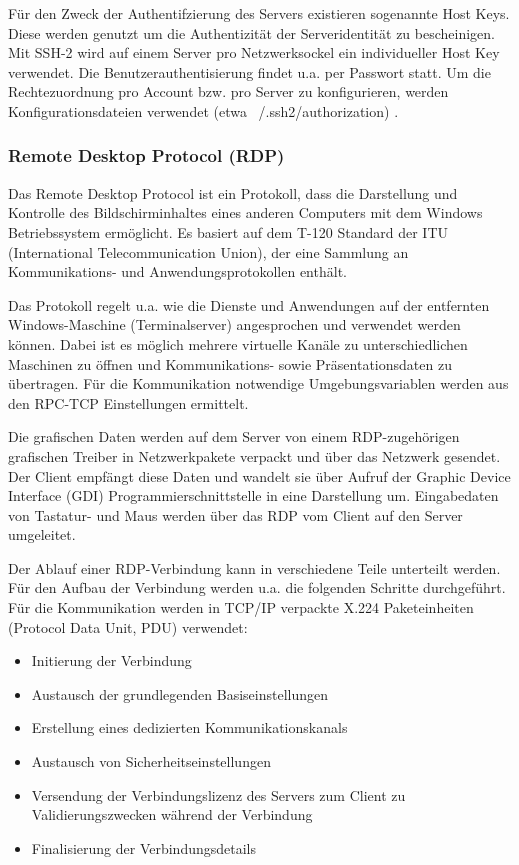 Für den Zweck der Authentifzierung des Servers existieren sogenannte \glqq Host Keys\grqq . Diese werden genutzt um die Authentizität der Serveridentität zu bescheinigen. Mit SSH-2 wird auf einem Server pro Netzwerksockel ein individueller Host Key verwendet. Die Benutzerauthentisierung findet u.a. per Passwort statt. Um die Rechtezuordnung pro Account bzw. pro Server zu konfigurieren, werden Konfigurationsdateien verwendet (etwa ~/.ssh2/authorization) \citep{SSH1}.

\subsubsection{Remote Desktop Protocol (RDP)}
Das Remote Desktop Protocol ist ein Protokoll, dass die Darstellung und Kontrolle des Bildschirminhaltes eines anderen Computers mit dem Windows Betriebssystem ermöglicht. Es basiert auf dem T-120 Standard der ITU (International Telecommunication Union), der eine Sammlung an Kommunikations- und Anwendungsprotokollen enthält.

Das Protokoll regelt u.a. wie die Dienste und Anwendungen auf der entfernten Windows-Maschine (Terminalserver) angesprochen und verwendet werden können. Dabei ist es möglich mehrere virtuelle Kanäle zu unterschiedlichen Maschinen zu öffnen und Kommunikations- sowie Präsentationsdaten zu übertragen. Für die Kommunikation notwendige Umgebungsvariablen werden aus den RPC-TCP Einstellungen ermittelt. 

Die grafischen Daten werden auf dem Server von einem RDP-zugehörigen grafischen Treiber in Netzwerkpakete verpackt und über das Netzwerk gesendet. Der Client empfängt diese Daten und wandelt sie über Aufruf der Graphic Device Interface (GDI) Programmierschnittstelle in eine Darstellung um. Eingabedaten von Tastatur- und Maus werden über das RDP vom Client auf den Server umgeleitet\citep{RDP1}. 

Der Ablauf einer RDP-Verbindung kann in verschiedene Teile unterteilt werden. Für den Aufbau der Verbindung werden u.a. die folgenden Schritte durchgeführt. Für die Kommunikation werden in TCP/IP verpackte X.224 Paketeinheiten (Protocol Data Unit, PDU) verwendet:
\begin{itemize}
\item Initierung der Verbindung
\item Austausch der grundlegenden Basiseinstellungen
\item Erstellung eines dedizierten Kommunikationskanals
\item Austausch von Sicherheitseinstellungen
\item Versendung der Verbindungslizenz des Servers zum Client zu Validierungszwecken während der Verbindung
\item Finalisierung der Verbindungsdetails
\end{itemize}

